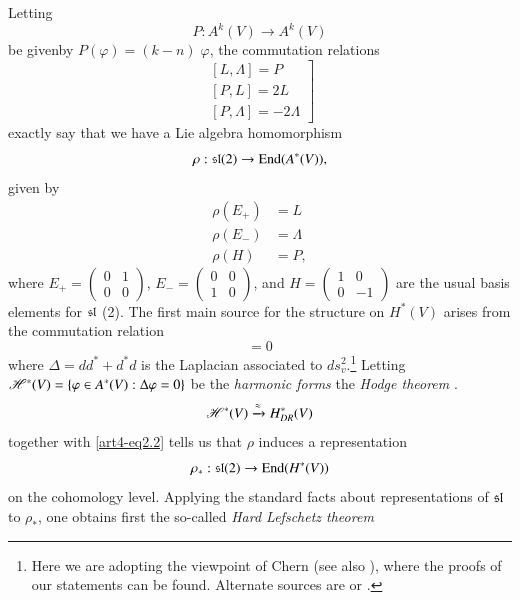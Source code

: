 Letting 
$$
P: A^k (V) \to A^k (V)
$$
be given\pageoriginale  by $P(\varphi) = (k-n)\; \varphi$, the commutation relations
\setcounter{equation}{0}
\begin{equation}
\left.
\begin{matrix}
[L, \Lambda]  = P\\
[P, L]  = 2L\\
[P, \Lambda]  = - 2 \Lambda 
\end{matrix}
\right] \label{art4-eq2.1}
\end{equation}
exactly say that we have a Lie algebra homomorphism
$$
\rho: \mathfrak{s}\mathfrak{l}(2) \to \operatorname{End} (A^\ast (V)),
$$
given by 
\begin{align*}
\rho (E_+) & = L \\
\rho(E_-) & = \Lambda\\
\rho (H) & = P,
\end{align*}
where $E_+ = \left(\begin{smallmatrix}
0 & 1\\
0 & 0
\end{smallmatrix} \right)$, $E_- = \left(\begin{smallmatrix}
0 & 0\\
1 & 0
\end{smallmatrix} \right)$, and $H = \left(\begin{smallmatrix}
1 & 0\\
0 & -1
\end{smallmatrix} \right)$ are the usual basis elements for $\mathfrak{s} \mathfrak{l}$ (2). The first main source for the structure on $H^\ast(V)$ arises from the commutation relation
\begin{equation}
[\rho, \Delta] = 0 \label{art4-eq2.2}
\end{equation}
where $\Delta = dd^\ast + d^\ast d$ is the Laplacian associated to $ds^2_v$.\footnote{Here we are adopting the viewpoint of Chern \cite{art4-key7} (see also \cite{art4-key46}), where the proofs of our statements can be found. Alternate sources are \cite{art4-key45} or \cite{art4-key47}.} Letting $\mathscr{H}^\ast(V) =\{\varphi \in A^{\ast} (V) : \Delta \varphi = 0\}$ be the \textit{harmonic forms} the \textit{Hodge theorem} \cite{art4-key44}.
$$
\mathscr{H}^\ast (V) \xrightarrow{\approx} H^\ast_{DR} (V)
$$
together with \eqref{art4-eq2.2} tells us that $\rho$ induces a representation
\begin{equation}
\rho_\ast : \mathfrak{s}\mathfrak{l} (2) \to \operatorname{End} (H^\ast (V)) \label{art4-eq2.4}
\end{equation}
on the cohomology level. Applying the standard facts about representations of $\mathfrak{s} \mathfrak{l}$ to $\rho_\ast$, one obtains first the so-called \textit{Hard Lefschetz theorem}
